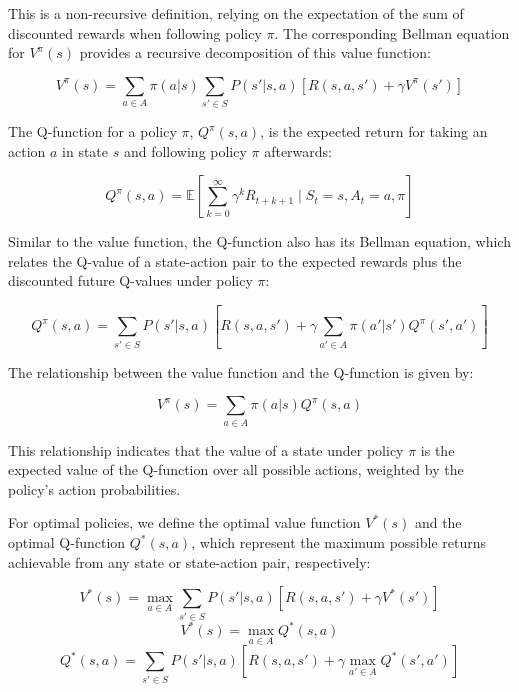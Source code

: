 This is a non-recursive definition, relying on the expectation of the sum of discounted rewards when following policy \( \pi \). The corresponding Bellman equation for \( V^\pi(s) \) provides a recursive decomposition of this value function:

\begin{equation}
V^\pi(s) = \sum_{a \in A} \pi(a|s) \sum_{s' \in S} P(s'|s,a) \left[ R(s,a,s') + \gamma V^\pi(s') \right]
\end{equation}

The Q-function for a policy \( \pi \), \( Q^\pi(s, a) \), is the expected return for taking an action \( a \) in state \( s \) and following policy \( \pi \) afterwards:

\begin{equation}
Q^\pi(s, a) = \mathbb{E} \left[ \sum_{k=0}^{\infty} \gamma^k R_{t+k+1} \mid S_t = s, A_t = a, \pi \right]
\end{equation}

Similar to the value function, the Q-function also has its Bellman equation, which relates the Q-value of a state-action pair to the expected rewards plus the discounted future Q-values under policy \( \pi \):

\begin{equation}
Q^\pi(s, a) = \sum_{s' \in S} P(s'|s,a) \left[ R(s,a,s') + \gamma \sum_{a' \in A} \pi(a'|s') Q^\pi(s', a') \right]
\end{equation}

The relationship between the value function and the Q-function is given by:

\begin{equation}
V^\pi(s) = \sum_{a \in A} \pi(a|s) Q^\pi(s, a)
\end{equation}

This relationship indicates that the value of a state under policy \( \pi \) is the expected value of the Q-function over all possible actions, weighted by the policy's action probabilities.

For optimal policies, we define the optimal value function \( V^*(s) \) and the optimal Q-function \( Q^*(s, a) \), which represent the maximum possible returns achievable from any state or state-action pair, respectively:

\begin{equation}
V^*(s) = \max_{a \in A} \sum_{s' \in S} P(s'|s,a) \left[ R(s,a,s') + \gamma V^*(s') \right]
\end{equation}
\begin{equation}
V^*(s) = \max_{a \in A} Q^*(s, a)
\end{equation}
\begin{equation}
Q^*(s, a) = \sum_{s' \in S} P(s'|s,a) \left[ R(s,a,s') + \gamma \max_{a' \in A} Q^*(s', a') \right]
\end{equation}

